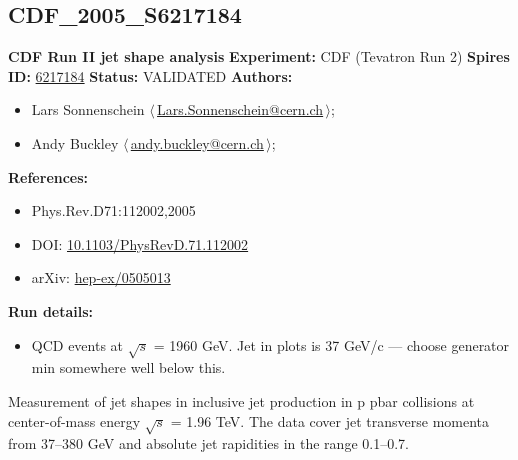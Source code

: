 \subsection[CDF\_2005\_S6217184]{CDF\_2005\_S6217184\,\cite{Acosta:2005ix}}
\textbf{CDF Run II jet shape analysis}\newline
\textbf{Experiment:} CDF (Tevatron Run 2) \newline
\textbf{Spires ID:} \href{http://www.slac.stanford.edu/spires/find/hep/www?rawcmd=key+6217184}{6217184}\newline
\textbf{Status:} VALIDATED\newline
\textbf{Authors:}
\begin{itemize}
  \item Lars Sonnenschein $\langle\,$\href{mailto:Lars.Sonnenschein@cern.ch}{Lars.Sonnenschein@cern.ch}$\,\rangle$;
  \item Andy Buckley $\langle\,$\href{mailto:andy.buckley@cern.ch}{andy.buckley@cern.ch}$\,\rangle$;
\end{itemize}
\textbf{References:}
\begin{itemize}
  \item Phys.Rev.D71:112002,2005
  \item DOI: \href{http://dx.doi.org/10.1103/PhysRevD.71.112002}{10.1103/PhysRevD.71.112002}
  \item arXiv: \href{http://arxiv.org/abs/hep-ex/0505013}{hep-ex/0505013}
\end{itemize}
\textbf{Run details:}
\begin{itemize}

  \item QCD events at \ensuremath{\sqrt{s}} = 1960 GeV. Jet \pTmin in plots is 37 GeV/c --- choose generator min \pT somewhere  well below this.\end{itemize}

\noindent Measurement of jet shapes in inclusive jet production in p pbar collisions at center-of-mass energy \ensuremath{\sqrt{s}} = 1.96 TeV. The data cover jet transverse momenta from 37--380 GeV and absolute jet rapidities in the range 0.1--0.7.

\clearpage


\clearpage

